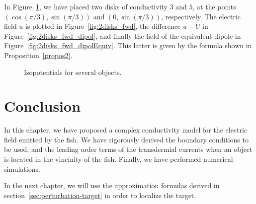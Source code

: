 In Figure~\ref{fig:2disks}, we have placed two disks of conductivity $3$ and $5$,
at the points $(\cos(\pi/3),\sin(\pi/3))$ and $(0,\sin(\pi/3))$, respectively. The
electric field $u$ is plotted in Figure~\ref{fig:2disks_fwd}, the difference $u-U$
in Figure~\ref{fig:2disks_fwd_dipol}, and finally the field of the equivalent dipole
in Figure~\ref{fig:2disks_fwd_dipolEquiv}. This latter is given by the formula
shown in Proposition~\ref{propos2}.

\begin{figure}[!h]
\centering%
\caption{Isopotentials for several objects.\label{fig:2disks}}
\end{figure}


\section{Conclusion}

In this chapter, we have proposed a complex conductivity model
for the electric field emitted by the fish. We have rigorously derived the boundary
conditions to be used, and the leading order terms of the transdermial currents
when an object is located in the vincinity of the fish. Finally, we have performed numerical simulations.

In the next chapter, we will use the approximation formulas derived 
in section~\ref{sec:perturbation-target} in order to localize the target.
